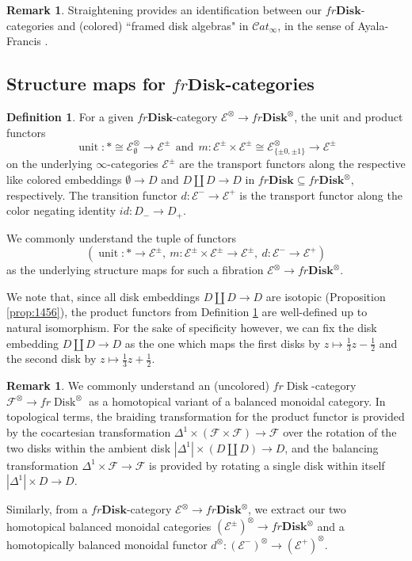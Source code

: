 \documentclass[reqno]{amsart}
\theoremstyle{definition}
\newtheorem{definition}[lemma]{Definition}
\newtheorem{remark}[lemma]{Remark}
\newcommand{\msc}[1]{\mathscr{#1}}
\newcommand{\opn}[1]{\operatorname{#1}}
\newcommand{\ot}{\otimes}
\newcommand{\sCat}{\msc{C}\!at}
\newcommand{\Disk}{\mathbf{Disk}}
\renewcommand{\1}{\mathbf{1}}
\begin{document}
\begin{remark}
Straightening provides an identification between our $fr\Disk$-categories and (colored) ``framed disk algebras" in $\sCat_{\infty}$, in the sense of Ayala-Francis \cite{ayalafrancis15}.
\end{remark}

\subsection{Structure maps for $fr\Disk$-categories}

\begin{definition}\label{def:str_frdisk}
For a given $fr\Disk$-category $\msc{E}^{\ot}\to fr\Disk^{\ot}$, the unit and product functors
\[
\opn{unit}:\ast\cong \msc{E}^{\ot}_{\emptyset}\to \msc{E}^{\pm}\ \ \text{and}\ \ m:\msc{E}^{\pm}\times\msc{E}^{\pm}\cong\msc{E}^{\ot}_{\{\pm 0,\pm 1\}}\to \msc{E}^{\pm}
\]
on the underlying $\infty$-categories $\msc{E}^{\pm}$ are the transport functors along the respective like colored embeddings $\emptyset\to D$ and $D\amalg D\to D$ in $fr\Disk\subseteq fr\Disk^{\ot}$, respectively. The transition functor $d:\msc{E}^-\to \msc{E}^+$ is the transport functor along the color negating identity $id:D_-\to D_+$.
\end{definition}

We commonly understand the tuple of functors
\[
(\opn{unit}:\ast\to \msc{E}^{\pm},\ m:\msc{E}^{\pm}\times\msc{E}^{\pm}\to \msc{E}^{\pm},\ d:\msc{E}^-\to \msc{E}^+)
\]
as the underlying structure maps for such a fibration $\msc{E}^{\ot}\to fr\Disk^{\ot}$.
\par

We note that, since all disk embeddings $D\amalg D\to D$ are isotopic (Proposition \ref{prop:1456}), the product functors from Definition \ref{def:str_frdisk} are well-defined up to natural isomorphism. For the sake of specificity however, we can fix the disk embedding $D\amalg D\to D$ as the one which maps the first disks by $z\mapsto \frac{1}{3}z-\frac{1}{2}$ and the second disk by $z\mapsto \frac{1}{3}z+\frac{1}{2}$.

\begin{remark}
We commonly understand an (uncolored) $fr\opn{Disk}$-category $\msc{F}^{\ot}\to fr\opn{Disk}^{\ot}$ as a homotopical variant of a balanced monoidal category. In topological terms, the braiding transformation for the product functor is provided by the cocartesian transformation $\Delta^1\times (\msc{F}\times\msc{F})\to \msc{F}$ over the rotation of the two disks within the ambient disk $|\Delta^1|\times(D\amalg D)\to D$, and the balancing transformation $\Delta^1\times\msc{F}\to \msc{F}$ is provided by rotating a single disk within itself $|\Delta^1|\times D\to D$.
\par

Similarly, from a $fr\Disk$-category $\msc{E}^{\ot}\to fr\Disk^{\ot}$, we extract our two homotopical balanced monoidal categories $(\msc{E}^{\pm})^{\ot}\to fr\Disk^{\ot}$ and a homotopically balanced monoidal functor $d^{\ot}:(\msc{E}^-)^{\ot}\to (\msc{E}^+)^{\ot}$.
\end{remark}
\end{document}
